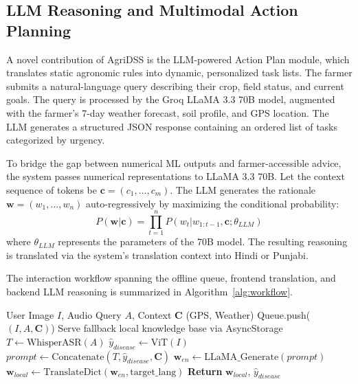 \documentclass[conference]{IEEEtran}
\begin{document}
\subsection{LLM Reasoning and Multimodal Action Planning}

A novel contribution of AgriDSS is the LLM-powered Action Plan module, which translates static agronomic rules into dynamic, personalized task lists. The farmer submits a natural-language query describing their crop, field status, and current goals. The query is processed by the Groq LLaMA 3.3 70B model, augmented with the farmer's 7-day weather forecast, soil profile, and GPS location. The LLM generates a structured JSON response containing an ordered list of tasks categorized by urgency.

To bridge the gap between numerical ML outputs and farmer-accessible advice, the system passes numerical representations to LLaMA 3.3 70B. Let the context sequence of tokens be $\mathbf{c} = (c_1, \dots, c_m)$. The LLM generates the rationale $\mathbf{w} = (w_1, \dots, w_n)$ auto-regressively by maximizing the conditional probability:
\begin{equation}
P(\mathbf{w}|\mathbf{c}) = \prod_{t=1}^{n} P(w_t | w_{1:t-1}, \mathbf{c}; \theta_{LLM})
\end{equation}
where $\theta_{LLM}$ represents the parameters of the 70B model. The resulting reasoning is translated via the system's translation context into Hindi or Punjabi.

The interaction workflow spanning the offline queue, frontend translation, and backend LLM reasoning is summarized in Algorithm~\ref{alg:workflow}.

\begin{algorithm}
\caption{Multimodal Offline-First Processing Pipeline}\label{alg:workflow}
\begin{algorithmic}[1]
\REQUIRE User Image $I$, Audio Query $A$, Context $\mathbf{C}$ (GPS, Weather)
    \STATE Queue.push($(I, A, \mathbf{C})$)
    \STATE Serve fallback local knowledge base via AsyncStorage
\ELSE
    \STATE $T \gets \text{WhisperASR}(A)$ 
    \STATE $\hat{y}_{disease} \gets \text{ViT}(I)$ 
    \STATE $prompt \gets \text{Concatenate}(T, \hat{y}_{disease}, \mathbf{C})$
    \STATE $\mathbf{w}_{en} \gets \text{LLaMA\_Generate}(prompt)$ 
    \STATE $\mathbf{w}_{local} \gets \text{TranslateDict}(\mathbf{w}_{en}, \text{target\_lang})$ 
    \STATE \textbf{Return} $\mathbf{w}_{local}$, $\hat{y}_{disease}$
\ENDIF
\end{algorithmic}
\end{algorithm}
\end{document}
